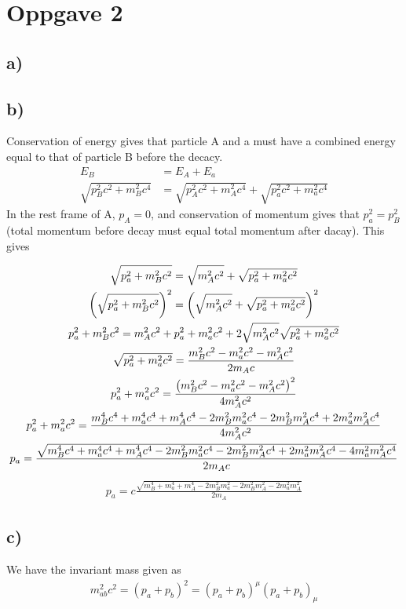 \documentclass[12p,a4paper]{article}
\begin{document}
\section*{Oppgave 2}
\subsection*{a)}


\subsection*{b)}
Conservation of energy gives that particle A and a must have a combined energy equal to that of particle B before the decacy.
\begin{align*}
    E_B &= E_A + E_a\\
    \sqrt{p_B^2c^2 + m_B^2c^4} &= \sqrt{p_A^2c^2 + m_A^2c^4} + \sqrt{p_a^2c^2 + m_a^2c^4}
\end{align*}
In the rest frame of A, $p_A = 0$, and conservation of momentum gives that $p_a^2 = p_B^2$ (total momentum before decay must equal total momentum after dacay). This gives

\begin{gather*}
    \sqrt{p_a^2 + m_B^2c^2} = \sqrt{m_A^2c^2} + \sqrt{p_a^2 + m_a^2c^2} \\
    \qty(\sqrt{p_a^2 + m_B^2c^2})^2 = \qty(\sqrt{m_A^2c^2} + \sqrt{p_a^2 + m_a^2c^2})^2 \\
    p_a^2 + m_B^2c^2 = m_A^2c^2 + p_a^2 + m_a^2c^2 + 2\sqrt{m_A^2c^2}\sqrt{p_a^2 + m_a^2c^2} \\
    \sqrt{p_a^2 + m_a^2c^2} = \frac{m_B^2c^2 - m_a^2c^2 - m_A^2c^2}{2m_Ac} \\
    p_a^2 + m_a^2c^2 = \frac{\qty(m_B^2c^2 - m_a^2c^2 - m_A^2c^2)^2}{4m_A^2c^2} \\
    p_a^2 + m_a^2c^2 = \frac{m_B^4c^4 + m_a^4c^4 + m_A^4c^4 - 2m_B^2m_a^2c^4 - 2m_B^2m_A^2c^4 + 2m_a^2m_A^2c^4}{4m_A^2c^2} \\
    p_a = \frac{\sqrt{m_B^4c^4 + m_a^4c^4 + m_A^4c^4 - 2m_B^2m_a^2c^4 - 2m_B^2m_A^2c^4 + 2m_a^2m_A^2c^4 - 4m_a^2m_A^2c^4}}{2m_Ac}
\end{gather*}
\begin{gather}\label{eqn:p_a}
    p_a = c\frac{\sqrt{m_B^4 + m_a^4 + m_A^4 - 2m_B^2m_a^2 - 2m_B^2m_A^2 - 2m_a^2m_A^2}}{2m_A}
\end{gather}


\subsection*{c)}
We have the invariant mass given as
\begin{gather*}
    m_{ab}^2c^2 = (p_a + p_b)^2 = (p_a + p_b)^\mu (p_a + p_b)_\mu
\end{gather*}
\end{document}
